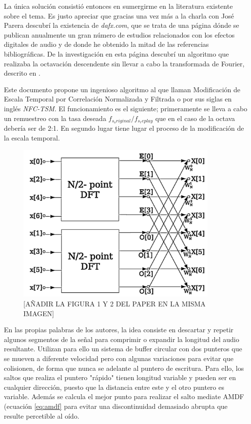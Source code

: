 La única solución consistió entonces en sumergirme en la literatura existente sobre el tema. Es justo apreciar que gracias una vez más a la charla con José Parera descubrí la existencia de \emph{dafx.com}, que se trata de una página dónde se publican anualmente un gran número de estudios relacionados con los efectos digitales de audio y de donde he obtenido la mitad de las referencias bibliográficas. De la investigación en esta página descubrí un algoritmo que realizaba la octavación descendente sin llevar a cabo la transformada de Fourier, descrito en \cite{nfctsm}.

Este documento propone un ingenioso algoritmo al que llaman Modificación de Escala Temporal por Correlación Normalizada y Filtrada o por sus siglas en inglés \emph{NFC-TSM}. El funcionamiento es el siguiente; primeramente se lleva a cabo un remuestreo con la tasa deseada $f_{s_original}/f_{s_replay}$ que en el caso de la octava debería ser de 2:1. En segundo lugar tiene lugar el proceso de la modificación de la escala temporal.

\begin{figure}[!ht]
\begin{center}
\includegraphics[width=10cm]{img/dft.png}
\caption{\label{fig:tsm}[AÑADIR LA FIGURA 1 Y 2 DEL PAPER EN LA MISMA IMAGEN]}
\end{center}
\end{figure}

En las propias palabras de los autores, la idea consiste en descartar y repetir algunos segmentos de la señal para comprimir o expandir la longitud del audio resultante. Utilizan para ello un sistema de buffer circular con dos punteros que se mueven a diferente velocidad pero con algunas variaciones para evitar que colisionen, de forma que nunca se adelante al puntero de escritura. Para ello, los saltos que realiza el puntero "rápido" tienen longitud variable y pueden ser en cualquier dirección, puesto que la distancia entre este y el otro puntero es variable. Además se calcula el mejor punto para realizar el salto mediate AMDF (ecuación \ref{eq:amdf} para evitar una discontinuidad demasiado abrupta que resulte percetible al oído. 

